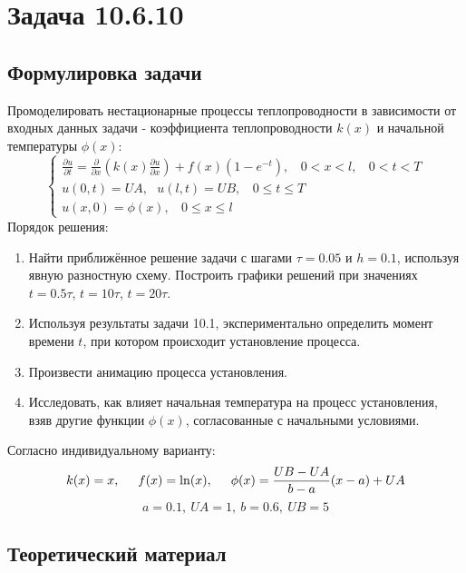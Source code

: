 \documentclass[12pt]{article}%
\begin{document}
\newpage
\section{Задача 10.6.10}
\subsection{Формулировка задачи}
Промоделировать нестационарные процессы теплопроводности в зависимости от входных данных задачи - коэффициента теплопроводности $k(x)$ и начальной температуры $\phi(x)$:
\begin{equation*}
\begin{cases}
\frac{\partial{u}}{\partial{t}} =
\frac{\partial}{\partial{x}} \left(
k(x) \frac{\partial{u}}{\partial{x}}
\right) + f(x) (1 - e^{-t}),\ \ \ \ 0 < x < l,\ \ \ \ 0 < t < T \\
u(0, t) = UA, \ \ \ u(l, t) = UB, \ \ \ \ 0 \le t \le T \\
u(x, 0) = \phi(x), \ \ \ \ 0 \le x \le l
\end{cases}
\end{equation*}
Порядок решения:
\begin{enumerate}
    \item Найти приближённое решение задачи с шагами $\tau = 0.05$ и $h=0.1$, используя явную разностную схему. Построить графики решений при значениях $t = 0.5 \tau$, $t = 10 \tau$, $t = 20 \tau$.
    \item Используя результаты задачи 10.1, экспериментально определить момент времени $t$, при котором происходит установление процесса.
    \item Произвести анимацию процесса установления.
    \item Исследовать, как влияет начальная температура на процесс установления, взяв другие функции $\phi(x)$, согласованные с начальными условиями.
\end{enumerate}
Согласно индивидуальному варианту:
\begin{equation*}
k(x) = x,\hspace{0.5cm} f(x) = \ln(x),\hspace{0.5cm} \phi(x) = \frac{UB - UA}{b - a}(x - a) + UA
\end{equation*}
\begin{equation*}
    a = 0.1,\ UA = 1,\ b = 0.6,\ UB = 5
\end{equation*}

\subsection{Теоретический материал}
\end{document}

